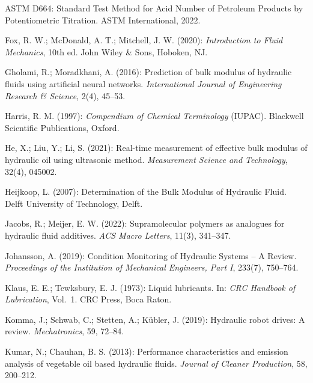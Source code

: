 ﻿\documentclass[a4paper,12pt]{scrreprt}
\theoremstyle{definition}
\begin{document}
\begin{enumerate}[label={[\arabic*]}]
  \item ASTM D664: Standard Test Method for Acid Number of Petroleum
    Products by Potentiometric Titration.
    ASTM International, 2022.

  \item Fox, R. W.; McDonald, A. T.; Mitchell, J. W. (2020):
    \textit{Introduction to Fluid Mechanics}, 10th ed.
    John Wiley \& Sons, Hoboken, NJ.

  \item Gholami, R.; Moradkhani, A. (2016): Prediction of bulk
    modulus of hydraulic fluids using artificial neural networks.
    \textit{International Journal of Engineering Research \& Science},
    2(4), 45--53.

  \item Harris, R. M. (1997): \textit{Compendium of Chemical Terminology}
    (IUPAC). Blackwell Scientific Publications, Oxford.

  \item He, X.; Liu, Y.; Li, S. (2021): Real-time measurement of
    effective bulk modulus of hydraulic oil using ultrasonic method.
    \textit{Measurement Science and Technology}, 32(4), 045002.

  \item Heijkoop, L. (2007): Determination of the Bulk Modulus of
    Hydraulic Fluid. Delft University of Technology, Delft.

  \item Jacobs, R.; Meijer, E. W. (2022): Supramolecular polymers
    as analogues for hydraulic fluid additives.
    \textit{ACS Macro Letters}, 11(3), 341--347.

  \item Johansson, A. (2019): Condition Monitoring of Hydraulic
    Systems -- A Review. \textit{Proceedings of the Institution of
    Mechanical Engineers, Part I}, 233(7), 750--764.

  \item Klaus, E. E.; Tewksbury, E. J. (1973): Liquid lubricants.
    In: \textit{CRC Handbook of Lubrication}, Vol.~1. CRC Press,
    Boca Raton.

  \item Komma, J.; Schwab, C.; Stetten, A.; Kübler, J. (2019):
    Hydraulic robot drives: A review. \textit{Mechatronics}, 59,
    72--84.

  \item Kumar, N.; Chauhan, B. S. (2013): Performance characteristics
    and emission analysis of vegetable oil based hydraulic fluids.
    \textit{Journal of Cleaner Production}, 58, 200--212.


\end{enumerate}
\end{document}
